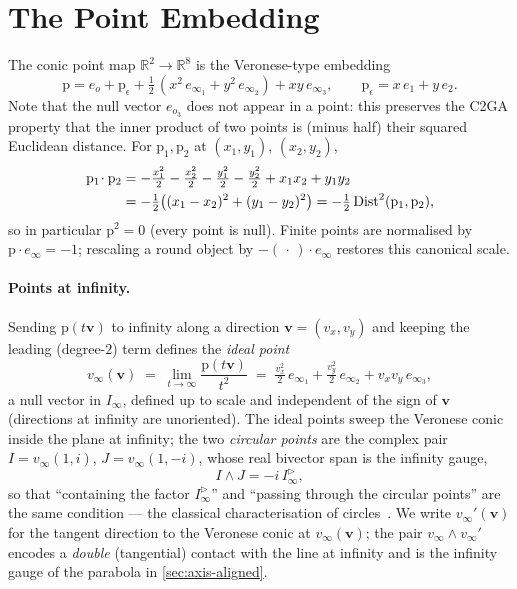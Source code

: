\documentclass{birkjour}
\theoremstyle{definition}
\theoremstyle{remark}
\newcommand{\eo}{e_o}
\newcommand{\einf}{e_\infty}
\newcommand{\Iinfd}{I_\infty^{\triangleright}}%
\newcommand{\Iinf}{I_\infty}
\newcommand{\joinp}{\wedge}
\begin{document}
\section{The Point Embedding}
\label{sec:point}
The conic point map $\mathbb{R}^2 \to \mathbb{R}^8$ is the Veronese-type embedding
\begin{equation}\label{eq:point}
  \mathrm{p} = \eo + \mathrm{p}_\epsilon
     + \tfrac12\,(x^2\,e_{\infty_1} + y^2\,e_{\infty_2}) + xy\,e_{\infty_3},
  \qquad \mathrm{p}_\epsilon = x\,e_1 + y\,e_2 .
\end{equation}
Note that the null vector $e_{o_3}$ does not appear in a point: this preserves
the C2GA property that the inner product of two points is (minus half) their
squared Euclidean distance. For $\mathrm{p}_1,\mathrm{p}_2$ at $(x_1,y_1)$,
$(x_2,y_2)$,
\begin{align}\label{eq:point-distance}
  \mathrm{p}_1\!\cdot \mathrm{p}_2
  &= -\tfrac{x_1^2}{2}-\tfrac{x_2^2}{2}-\tfrac{y_1^2}{2}-\tfrac{y_2^2}{2}
     + x_1x_2 + y_1y_2 \notag\\
  &= -\tfrac12\big((x_1-x_2)^2+(y_1-y_2)^2\big)
   = -\tfrac12\,\mathrm{Dist}^2(\mathrm{p}_1,\mathrm{p}_2),
\end{align}
so in particular $\mathrm{p}^2 = 0$ (every point is null). Finite points are
normalised by $\mathrm{p}\cdot\einf=-1$; rescaling a round object by
$-(\,\cdot\,)\cdot\einf$ restores this canonical scale.

\paragraph{Points at infinity.}
Sending $\mathrm{p}(t\mathbf{v})$ to infinity along a direction
$\mathbf{v}=(v_x,v_y)$ and keeping the leading (degree-$2$) term defines the
\emph{ideal point}
\begin{equation}\label{eq:ideal-point}
  v_\infty(\mathbf{v}) \;=\; \lim_{t\to\infty}\frac{\mathrm{p}(t\mathbf{v})}{t^2}
  \;=\; \tfrac{v_x^2}{2}\,e_{\infty_1} + \tfrac{v_y^2}{2}\,e_{\infty_2}
        + v_xv_y\,e_{\infty_3},
\end{equation}
a null vector in $\Iinf$, defined up to scale and independent of the sign of
$\mathbf{v}$ (directions at infinity are unoriented). The ideal points sweep
the Veronese conic inside the plane at infinity; the two \emph{circular
points} are the complex pair $I=v_\infty(1,i)$, $J=v_\infty(1,-i)$, whose real
bivector span is the infinity gauge,
\begin{equation}\label{eq:circular-points}
  I\joinp J = -i\,\Iinfd ,
\end{equation}
so that ``containing the factor $\Iinfd$'' and ``passing through the circular
points'' are the same condition --- the classical characterisation of
circles~\cite{richter-gebert_perspectives_2011}. We write
$v_\infty'(\mathbf{v})$ for the tangent direction to the Veronese conic at
$v_\infty(\mathbf{v})$; the pair $v_\infty\joinp v_\infty'$ encodes a
\emph{double} (tangential) contact with the line at infinity and is the
infinity gauge of the parabola in \cref{sec:axis-aligned}.
\end{document}
